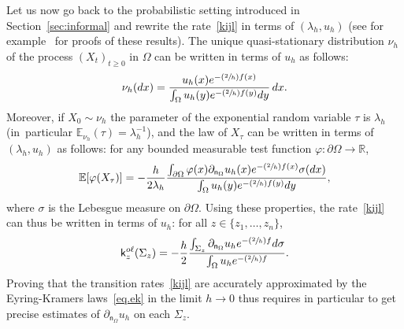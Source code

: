 \documentclass[JEP,XML,SOM,Unicode,NoEqCountersInSection,NoFloatCountersInSection,published]{cedram}
\newcommand{\Psfrac}[2]{(\sfrac{#1}{#2})}
\theoremstyle{plain}
\theoremstyle{definition}
\begin{document}
Let us now go back to the probabilistic setting introduced
in Section~\ref{sec:informal} and rewrite the rate~\eqref{kijl} in
terms of $(\lambda_h,u_h)$ (see for example~\cite{le2012mathematical}
for proofs of these results). The unique quasi-stationary distribution $\nu_h$ of the
process $(X_t)_{t \ge 0}$ in $\Omega$ can be written in terms of $u_h$
as follows:\vspace*{-3pt}
\begin{equation} \label{eq.expQSD}
\nu_h(dx)=\frac{ u_{h}(x) e^{-\Psfrac{2}{h} f(x)}}{ \int_{\Omega}u_{h}(y) e^{-\Psfrac{2}{h} f(y)}dy}\, dx.
\end{equation}
Moreover, if $X_0 \sim \nu_h$ the parameter of the exponential random
variable $\tau$ is $\lambda_h$ (in~particular $\mathbb E_{\nu_h}(\tau)=\lambda_h^{-1}$), and the law of $X_\tau$ can be
written in terms of $(\lambda_h,u_h)$ as follows: for any bounded measurable test function
$\varphi: \partial \Omega \to \mathbb R$,
\begin{equation}\label{eq.dens}
\mathbb E [\varphi (X_\tau)]=- \frac{h}{2\lambda_{h}}
\frac{\int_{\partial \Omega}\varphi (x) \partial_{\mathsf n_\Omega}
u_{h}(x) e^{-\Psfrac{2}{h} f(x)} \sigma(dx) }{ \int_{\Omega} u_{h}(y) e^{-\Psfrac{2}{h} f(y)} dy},
\end{equation}
where $\sigma$ is the Lebesgue measure on $\partial \Omega$.
Using these properties, the rate~\eqref{kijl} can thus be written in terms
of $u_h$: for all $z \in \{z_1, \ldots, z_n\}$,\vspace*{-3pt}
\begin{equation}\label{eq.expk}
\mathsf k_{z}^{o\ell}(\Sigma_{z})=-\frac {h}{2} \frac{ \int_{\Sigma_{z}} \partial_{\mathsf n_\Omega}
u_h e^{-\Psfrac{2}{h} f} d\sigma }{ \int_\Omega u_h e^{-\Psfrac{2}{h} f}}.
\end{equation}
Proving that the transition rates~\eqref{kijl} are accurately
approximated by the Eyring-Kramers laws~\eqref{eq.ek} in the limit $h
\to 0$ thus requires in particular to get precise estimates of $\partial_{\mathsf n_\Omega}
u_h$ on each $\Sigma_{z}$.
\end{document}
